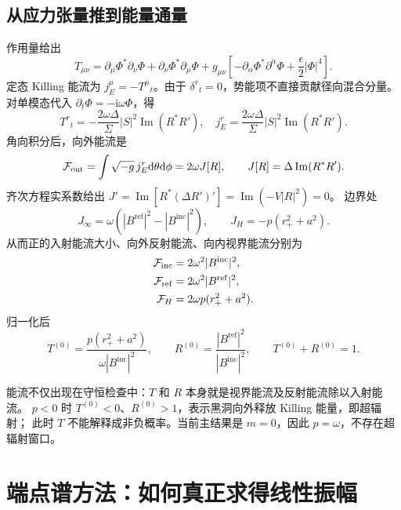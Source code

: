 \documentclass[UTF8,fontset=fandol,11pt,a4paper]{ctexart}
\newcommand{\ii}{\mathrm{i}}
\newcommand{\dd}{\mathrm{d}}
\newcommand{\Ima}{\operatorname{Im}}
\newcommand{\Bin}{B^{\mathrm{inc}}}
\newcommand{\Bref}{B^{\mathrm{ref}}}
\numberwithin{equation}{section}
\begin{document}
\subsection{从应力张量推到能量通量}
作用量给出
\begin{equation}
T_{\mu\nu}=\partial_\mu\Phi^*\partial_\nu\Phi+\partial_\nu\Phi^*\partial_\mu\Phi
+g_{\mu\nu}\left[-\partial_\alpha\Phi^*\partial^\alpha\Phi
+\frac{\epsilon}{2}|\Phi|^4\right].
\end{equation}
定态 Killing 能流为 $j_E^\mu=-T^\mu{}_t$。由于 $\delta^r{}_t=0$，势能项不直接贡献径向混合分量。
对单模态代入 $\partial_t\Phi=-\ii\omega\Phi$，得
\begin{equation}
T^r{}_t=-\frac{2\omega\Delta}{\Sigma}|S|^2\Ima(R^*R'),
\quad j_E^r=\frac{2\omega\Delta}{\Sigma}|S|^2\Ima(R^*R').
\end{equation}
角向积分后，向外能流是
\begin{equation}
\mathcal F_{\rm out}=\int\sqrt{-g}\,j_E^r\dd\theta\dd\phi
=2\omega J[R],\qquad J[R]=\Delta\Ima(R^*R').\label{current}
\end{equation}
齐次方程实系数给出
$J'=\Ima[R^*(\Delta R')']=\Ima(-V|R|^2)=0$。
边界处
\begin{equation}
J_\infty=\omega(|\Bref|^2-|\Bin|^2),\qquad
J_H=-p(r_+^2+a^2).
\end{equation}
从而正的入射能流大小、向外反射能流、向内视界能流分别为
\begin{align}
\mathcal F_{\rm inc}&=2\omega^2|\Bin|^2,\\
\mathcal F_{\rm ref}&=2\omega^2|\Bref|^2,\\
\mathcal F_H&=2\omega p(r_+^2+a^2).
\end{align}
归一化后
\begin{equation}
T^{(0)}=\frac{p(r_+^2+a^2)}{\omega|\Bin|^2},\qquad
R^{(0)}=\frac{|\Bref|^2}{|\Bin|^2},\qquad T^{(0)}+R^{(0)}=1.
\end{equation}
\begin{remarkbox}
能流不仅出现在守恒检查中：$T$ 和 $R$ 本身就是视界能流及反射能流除以入射能流。
$p<0$ 时 $T^{(0)}<0$、$R^{(0)}>1$，表示黑洞向外释放 Killing 能量，即超辐射；
此时 $T$ 不能解释成非负概率。当前主结果是 $m=0$，因此 $p=\omega$，不存在超辐射窗口。
\end{remarkbox}

\section{端点谱方法：如何真正求得线性振幅}
\end{document}
